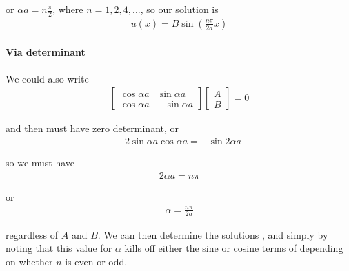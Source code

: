 {or \(\alpha a = n \frac{\pi}{2}\), where \(n = 1, 2, 4, ...\), so our solution is
%
\begin{equation}\label{eqn:PHY356Lecture9:10}
\begin{aligned}
u(x) = B \sin \left( \frac{n \pi}{2 a} x \right)
\end{aligned}
\end{equation}

\paragraph{Via determinant}

We could also write
\begin{equation}\label{eqn:lecture9boundStates:160}
\begin{aligned}
\begin{bmatrix}
\cos \alpha a & \sin\alpha a \\
\cos \alpha a & - \sin\alpha a
\end{bmatrix}
\begin{bmatrix}
A \\
B
\end{bmatrix}
= 0
\end{aligned}
\end{equation}

and then must have zero determinant, or
%
\begin{equation}\label{eqn:PHY356Lecture9:11}
\begin{aligned}
-2 \sin\alpha a \cos\alpha a = -\sin 2 \alpha a
\end{aligned}
\end{equation}

so we must have
\begin{equation}\label{eqn:lecture9boundStates:180}
\begin{aligned}
2 \alpha a = n \pi
\end{aligned}
\end{equation}

or
\begin{equation}\label{eqn:lecture9boundStates:200}
\begin{aligned}
\alpha = \frac{n \pi}{2a}
\end{aligned}
\end{equation}

regardless of \(A\) and \(B\).  We can then determine the solutions , and  simply by noting that this value for \(\alpha\) kills off either the sine or cosine terms of  depending on whether \(n\) is even or odd.

}
